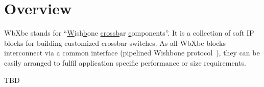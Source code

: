 

\section{Overview}

WbXbc stands for ``\underline{W}ish\underline{b}one \underline{cross}\underline{b}ar \underline{c}omponents''.
It is a collection of soft IP blocks for building customized crossbar switches.
As all WbXbc blocks interconnect via a common interface (pipelined Wishbone protocol~\cite{wishbone}),
they can be easily arranged to fulfil application specific performance or size requirements.   

TBD
